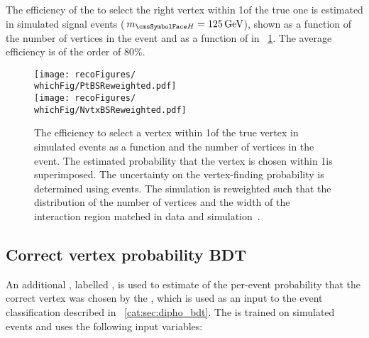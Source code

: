 The efficiency of the \VtxIdBdt to select the right vertex within 1\cm of the true one is estimated in simulated signal events ($\mH=125\GeV$), shown as a function of the number of vertices in the event and as a function of \pT in \Fig~\ref{fig:reco:vtxidbdt_eff}. The average efficiency is of the order of 80\%. 

\begin{figure}[hpt]
\centering
\texttt{[image: recoFigures/\\whichFig/PtBSReweighted.pdf]}\\
\texttt{[image: recoFigures/\\whichFig/NvtxBSReweighted.pdf]}
\caption[The efficiency to select a vertex within 1\cm of the true vertex in simulated \Hgg events as a function \pT and the number of vertices in the event. The estimated probability that the vertex is chosen within 1\cm is superimposed. The uncertainty on the vertex-finding probability is determined using \Zmumu events. The simulation is reweighted such that the distribution of the number of vertices and the width of the interaction region matched in data and simulation\quad\cite{CMS-PAS-HIG-16-020}.]{The efficiency to select a vertex within 1\cm of the true vertex in simulated \Hgg events as a function \pT and the number of vertices in the event. The estimated probability that the vertex is chosen within 1\cm is superimposed. The uncertainty on the vertex-finding probability is determined using \Zmumu events. The simulation is reweighted such that the distribution of the number of vertices and the width of the interaction region matched in data and simulation~\cite{CMS-PAS-HIG-16-020}.}

\label{fig:reco:vtxidbdt_eff}
\end{figure}

\subsection{Correct vertex probability BDT}
\label{reco:sec:vtx_prob}

An additional \BDT, labelled \VtxProbBdt, is used to estimate of the per-event probability that the correct vertex was chosen by the \VtxProbBdt, which is used as an input to the event classification \BDT described in \Sec~\ref{cat:sec:dipho_bdt}. The \VtxProbBdt is trained on simulated \Hgg events and uses the following input variables: 

